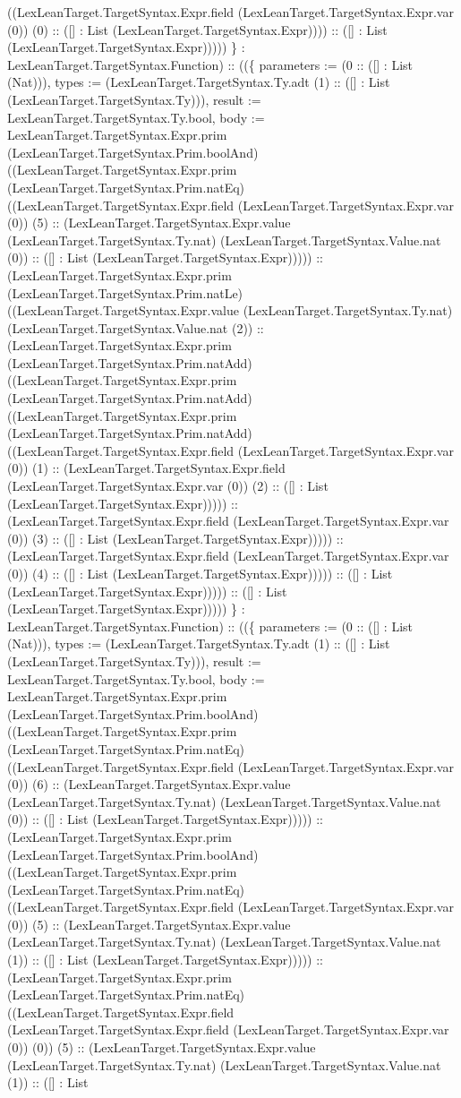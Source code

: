\documentclass[11pt]{article}
\begin{document}
((LexLeanTarget.TargetSyntax.Expr.field (LexLeanTarget.TargetSyntax.Expr.var (0)) (0) :: ([] : List (LexLeanTarget.TargetSyntax.Expr)))) :: ([] : List (LexLeanTarget.TargetSyntax.Expr))))) \} : LexLeanTarget.TargetSyntax.Function) :: ((\{ parameters := (0 :: ([] : List (Nat))), types := (LexLeanTarget.TargetSyntax.Ty.adt (1) :: ([] : List (LexLeanTarget.TargetSyntax.Ty))), result := LexLeanTarget.TargetSyntax.Ty.bool, body := LexLeanTarget.TargetSyntax.Expr.prim (LexLeanTarget.TargetSyntax.Prim.boolAnd) ((LexLeanTarget.TargetSyntax.Expr.prim (LexLeanTarget.TargetSyntax.Prim.natEq) ((LexLeanTarget.TargetSyntax.Expr.field (LexLeanTarget.TargetSyntax.Expr.var (0)) (5) :: (LexLeanTarget.TargetSyntax.Expr.value (LexLeanTarget.TargetSyntax.Ty.nat) (LexLeanTarget.TargetSyntax.Value.nat (0)) :: ([] : List (LexLeanTarget.TargetSyntax.Expr))))) :: (LexLeanTarget.TargetSyntax.Expr.prim (LexLeanTarget.TargetSyntax.Prim.natLe) ((LexLeanTarget.TargetSyntax.Expr.value (LexLeanTarget.TargetSyntax.Ty.nat) (LexLeanTarget.TargetSyntax.Value.nat (2)) :: (LexLeanTarget.TargetSyntax.Expr.prim (LexLeanTarget.TargetSyntax.Prim.natAdd) ((LexLeanTarget.TargetSyntax.Expr.prim (LexLeanTarget.TargetSyntax.Prim.natAdd) ((LexLeanTarget.TargetSyntax.Expr.prim (LexLeanTarget.TargetSyntax.Prim.natAdd) ((LexLeanTarget.TargetSyntax.Expr.field (LexLeanTarget.TargetSyntax.Expr.var (0)) (1) :: (LexLeanTarget.TargetSyntax.Expr.field (LexLeanTarget.TargetSyntax.Expr.var (0)) (2) :: ([] : List (LexLeanTarget.TargetSyntax.Expr))))) :: (LexLeanTarget.TargetSyntax.Expr.field (LexLeanTarget.TargetSyntax.Expr.var (0)) (3) :: ([] : List (LexLeanTarget.TargetSyntax.Expr))))) :: (LexLeanTarget.TargetSyntax.Expr.field (LexLeanTarget.TargetSyntax.Expr.var (0)) (4) :: ([] : List (LexLeanTarget.TargetSyntax.Expr))))) :: ([] : List (LexLeanTarget.TargetSyntax.Expr))))) :: ([] : List (LexLeanTarget.TargetSyntax.Expr))))) \} : LexLeanTarget.TargetSyntax.Function) :: ((\{ parameters := (0 :: ([] : List (Nat))), types := (LexLeanTarget.TargetSyntax.Ty.adt (1) :: ([] : List (LexLeanTarget.TargetSyntax.Ty))), result := LexLeanTarget.TargetSyntax.Ty.bool, body := LexLeanTarget.TargetSyntax.Expr.prim (LexLeanTarget.TargetSyntax.Prim.boolAnd) ((LexLeanTarget.TargetSyntax.Expr.prim (LexLeanTarget.TargetSyntax.Prim.natEq) ((LexLeanTarget.TargetSyntax.Expr.field (LexLeanTarget.TargetSyntax.Expr.var (0)) (6) :: (LexLeanTarget.TargetSyntax.Expr.value (LexLeanTarget.TargetSyntax.Ty.nat) (LexLeanTarget.TargetSyntax.Value.nat (0)) :: ([] : List (LexLeanTarget.TargetSyntax.Expr))))) :: (LexLeanTarget.TargetSyntax.Expr.prim (LexLeanTarget.TargetSyntax.Prim.boolAnd) ((LexLeanTarget.TargetSyntax.Expr.prim (LexLeanTarget.TargetSyntax.Prim.natEq) ((LexLeanTarget.TargetSyntax.Expr.field (LexLeanTarget.TargetSyntax.Expr.var (0)) (5) :: (LexLeanTarget.TargetSyntax.Expr.value (LexLeanTarget.TargetSyntax.Ty.nat) (LexLeanTarget.TargetSyntax.Value.nat (1)) :: ([] : List (LexLeanTarget.TargetSyntax.Expr))))) :: (LexLeanTarget.TargetSyntax.Expr.prim (LexLeanTarget.TargetSyntax.Prim.natEq) ((LexLeanTarget.TargetSyntax.Expr.field (LexLeanTarget.TargetSyntax.Expr.field (LexLeanTarget.TargetSyntax.Expr.var (0)) (0)) (5) :: (LexLeanTarget.TargetSyntax.Expr.value (LexLeanTarget.TargetSyntax.Ty.nat) (LexLeanTarget.TargetSyntax.Value.nat (1)) :: ([] : List 
\end{document}
